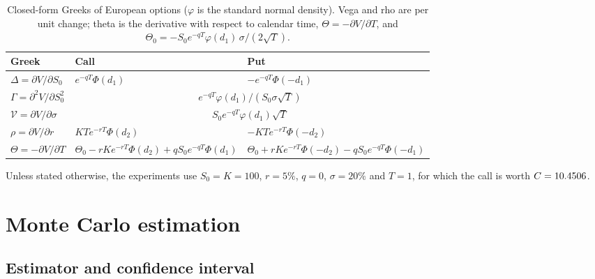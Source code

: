 \documentclass[11pt,a4paper]{article}
\newcommand{\1}{\mathbf{1}}
\theoremstyle{plain}
\theoremstyle{remark}
\begin{document}
\begin{table}[ht]
\centering
\caption{Closed-form Greeks of European options ($\varphi$ is the standard normal density). Vega and rho are
per unit change; theta is the derivative with respect to calendar time, $\Theta = -\partial V/\partial T$, and
$\Theta_0 = -S_0 e^{-qT}\varphi(d_1)\,\sigma/(2\sqrt{T})$.}
\label{tab:greeks-formulas}
\small
\renewcommand{\arraystretch}{1.25}
\begin{tabular}{lll}
\toprule
Greek & Call & Put \\
\midrule
$\Delta = \partial V/\partial S_0$ & $e^{-qT}\Phi(d_1)$ & $-e^{-qT}\Phi(-d_1)$ \\
$\Gamma = \partial^2 V/\partial S_0^2$ & \multicolumn{2}{c}{$e^{-qT}\varphi(d_1) / (S_0 \sigma \sqrt{T})$} \\
$\mathcal{V} = \partial V/\partial \sigma$ & \multicolumn{2}{c}{$S_0 e^{-qT} \varphi(d_1)\sqrt{T}$} \\
$\rho = \partial V/\partial r$ & $K T e^{-rT}\Phi(d_2)$ & $-K T e^{-rT}\Phi(-d_2)$ \\
$\Theta = -\partial V/\partial T$ & $\Theta_0 - rKe^{-rT}\Phi(d_2) + qS_0e^{-qT}\Phi(d_1)$
         & $\Theta_0 + rKe^{-rT}\Phi(-d_2) - qS_0e^{-qT}\Phi(-d_1)$ \\
\bottomrule
\end{tabular}
\end{table}

Unless stated otherwise, the experiments use $S_0 = K = 100$, $r = 5\%$, $q = 0$, $\sigma = 20\%$ and $T = 1$,
for which the call is worth $C = 10.4506$.

\section{Monte Carlo estimation}\label{sec:mc}

\subsection{Estimator and confidence interval}
\end{document}
